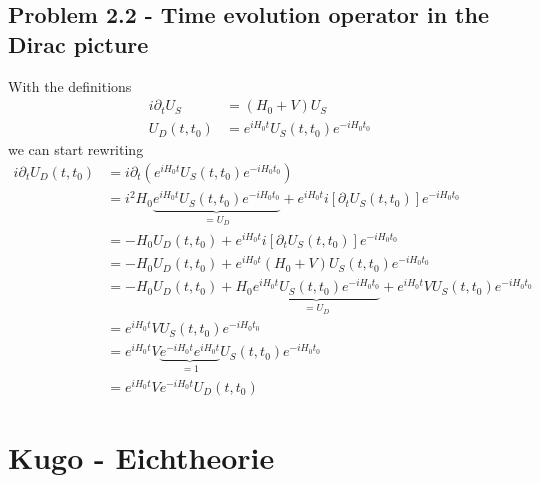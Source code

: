 \documentclass[10pt,a4paper]{book}
\theoremstyle{definition}
\begin{document}
\subsection{Problem 2.2 - Time evolution operator in the Dirac picture}
With the definitions
\begin{align}
i\partial_tU_S&=(H_0+V)U_S\\
U_D(t,t_0)&=e^{iH_0t}U_S(t,t_0)e^{-iH_0t_0}
\end{align}
we can start rewriting
\begin{align}
i\partial_t U_D(t,t_0)
&=i\partial_t \left(e^{iH_0t}U_S(t,t_0)e^{-iH_0t_0}\right)\\
&=i^2H_0\underbrace{e^{iH_0t}U_S(t,t_0)e^{-iH_0t_0}}_{=U_D}+e^{iH_0t}i[\partial_tU_S(t,t_0)]e^{-iH_0t_0}\\
&=-H_0 U_D(t,t_0)+e^{iH_0t}i[\partial_tU_S(t,t_0)]e^{-iH_0t_0}\\
&=-H_0 U_D(t,t_0)+e^{iH_0t}(H_0+V)U_S(t,t_0)e^{-iH_0t_0}\\
&=-H_0 U_D(t,t_0)+H_0\underbrace{e^{iH_0t}U_S(t,t_0)e^{-iH_0t_0}}_{=U_D}+e^{iH_0t}VU_S(t,t_0)e^{-iH_0t_0}\\
&=e^{iH_0t}VU_S(t,t_0)e^{-iH_0t_0}\\
&=e^{iH_0t}V\underbrace{e^{-iH_0t}e^{iH_0t}}_{=1}U_S(t,t_0)e^{-iH_0t_0}\\
&=e^{iH_0t}Ve^{-iH_0t}U_D(t,t_0)
\end{align}


\newpage
\section{{\sc Kugo} - Eichtheorie}
\end{document}
